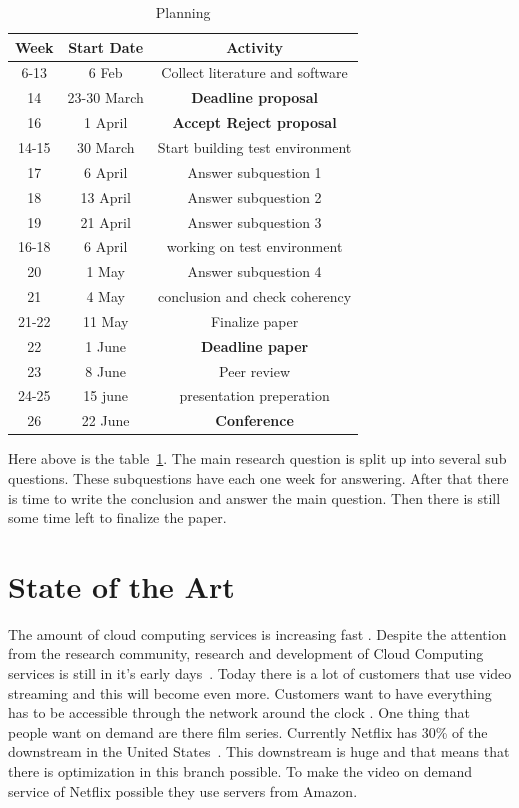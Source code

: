 \documentclass{sig-alternate-br}
\begin{document}
\begin{table}[H]
	\centering \caption{Planning}
\begin{tabular}{|c|c|c|} \hline
		\textbf{Week} & \textbf{Start Date} & \textbf{Activity} \\ \hline 
		6-13& 6 Feb& Collect literature and software\\ \hline 	
		14& 23-30 March & \textbf{Deadline proposal} \\ \hline
		16 & 1 April &  \textbf{Accept Reject proposal} \\ \hline
		14-15& 30 March& Start building test environment \\ \hline
		17& 6 April & Answer subquestion 1  \\ \hline
		18& 13 April & Answer subquestion 2\\ \hline
		19& 21 April & Answer subquestion 3\\ \hline
		16-18 & 6 April  & working on test environment \\ \hline
		20& 1 May  & Answer subquestion 4 \\ \hline
		21& 4 May & conclusion and check coherency \\ \hline
		21-22& 11 May & Finalize paper \\ \hline
		22& 1 June &  \textbf{Deadline paper} \\ \hline
		23& 8 June & Peer review \\ \hline
		24-25& 15 june & presentation preperation \\ \hline
		26 & 22 June & \textbf{Conference} \\ \hline
		\end{tabular}

		\label{tab:planning}
\end{table}
Here above is the table~\ref{tab:planning}. The main research question is split up into several sub questions. These subquestions have each one week for answering. After that there is time to write the conclusion and answer the main question. Then there is still some time left to finalize the paper. 

\section{State of the Art}
The amount of cloud computing services is increasing fast \cite{armbrust:2009}. Despite the attention
from the research community, research and development of
Cloud Computing services is still in it's early days~\cite{tso:2013}. Today there is a lot of customers that use video streaming and this will become even more. Customers want to have everything has to be accessible through the network around the clock \cite{youseff:2008}. One thing that people want on demand are there film series. Currently Netflix has 30\% of the downstream in the United States~\cite{computer-networking}. This downstream is huge and that means that there is optimization in this branch possible. To make the video on demand service of Netflix possible they use servers from Amazon. 
\end{document}

